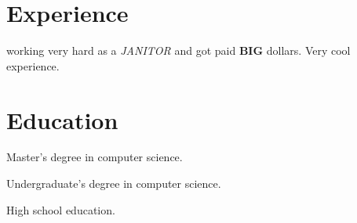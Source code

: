 \documentclass[paper=a4, fontsize=11pt]{resume}
\begin{document}


\section{Experience}


working very hard as a \emph{JANITOR} and got paid \textbf{BIG}
dollars. Very cool experience.

\section{Education}


Master's degree in computer science.


Undergraduate's degree in computer science.


High school education.
\end{document}
